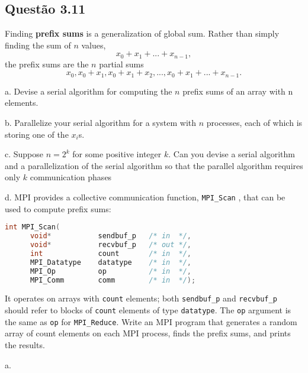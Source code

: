 

\subsection{Questão 3.11}

Finding \textbf{prefix sums} is a generalization of global sum. Rather than simply finding the sum of $n$ values,
\begin{equation*}
  x_{0} + x_{1} + ... + x_{n-1},
\end{equation*}
the prefix sums are the $n$ partial sums
\begin{equation*}
  x_{0}, x_{0} + x_{1} , x_{0} + x_{1} + x_{2} , ... , x_{0} + x_{1} + ... + x_{n-1}.
\end{equation*}


a. Devise a serial algorithm for computing the $n$ prefix sums of an array with n elements.

b. Parallelize your serial algorithm for a system with $n$ processes, each of which is storing one of the $x_{i}$s.

c. Suppose $n = 2^{k}$ for some positive integer $k$. Can you devise a serial algorithm and a parallelization of the serial algorithm so that the parallel algorithm requires only $k$ communication phases

d. MPI provides a collective communication function, \texttt{MPI\_Scan} , that can be used to compute prefix sums:

\begin{lstlisting}[language=C]
int MPI_Scan(
      void*           sendbuf_p   /* in  */,
      void*           recvbuf_p   /* out */,
      int             count       /* in  */,
      MPI_Datatype    datatype    /* in  */,
      MPI_Op          op          /* in  */,
      MPI_Comm        comm        /* in  */);
\end{lstlisting}

It operates on arrays with \texttt{count} elements; both \texttt{sendbuf\_p} and \texttt{recvbuf\_p} should refer to blocks of \texttt{count} elements of type \texttt{datatype}. The \texttt{op} argument is the same as \texttt{op} for \texttt{MPI\_Reduce}. Write an MPI program that generates a random array of count elements on each MPI process, finds the prefix sums, and prints the results.

a.


